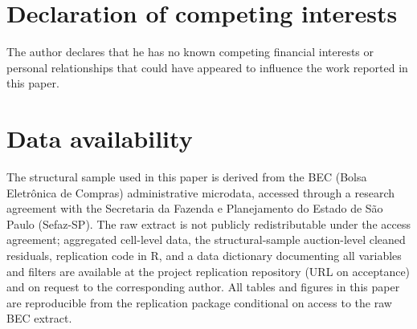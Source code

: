 \documentclass[12pt]{elsarticle}
\begin{document}











\section*{Declaration of competing interests}

The author declares that he has no known competing financial interests or personal relationships that could have appeared to influence the work reported in this paper.

\section*{Data availability}

The structural sample used in this paper is derived from the BEC (Bolsa Eletr\^onica de Compras) administrative microdata, accessed through a research agreement with the Secretaria da Fazenda e Planejamento do Estado de S\~ao Paulo (Sefaz-SP). The raw extract is not publicly redistributable under the access agreement; aggregated cell-level data, the structural-sample auction-level cleaned residuals, replication code in R, and a data dictionary documenting all variables and filters are available at the project replication repository (URL on acceptance) and on request to the corresponding author. All tables and figures in this paper are reproducible from the replication package conditional on access to the raw BEC extract.

\clearpage






\end{document}
